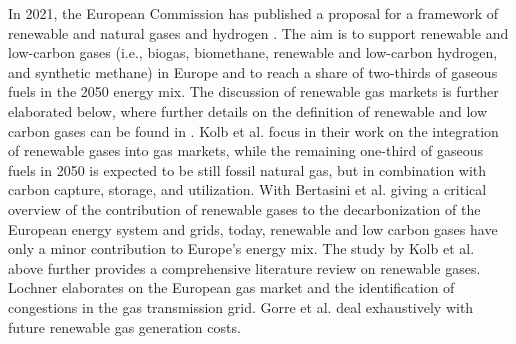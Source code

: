 In 2021, the European Commission has published a proposal for a framework of renewable and natural gases and hydrogen \cite{regulation_renewable_gases}. The aim is to support renewable and low-carbon gases (i.e., biogas, biomethane, renewable and low-carbon hydrogen, and synthetic methane) in Europe and to reach a share of two-thirds of gaseous fuels in the 2050 energy mix. The discussion of renewable gas markets is further elaborated below, where further details on the definition of renewable and low carbon gases can be found in \cite{briefing_renewable_gases}.  Kolb et al. \cite{kolb2021scenarios} focus in their work on the integration of renewable gases into gas markets, while the remaining one-third of gaseous fuels in 2050 is expected to be still fossil natural gas, but in combination with carbon capture, storage, and utilization. With Bertasini et al. \cite{bertasini2023decarbonization} giving a critical overview of the contribution of renewable gases to the decarbonization of the European energy system and grids, today, renewable and low carbon gases have only a minor contribution to Europe's energy mix. The study by Kolb et al. \cite{kolb2021scenarios} above further provides a comprehensive literature review on renewable gases. Lochner \cite{lochner2011identification} elaborates on the European gas market and the identification of congestions in the gas transmission grid. Gorre et al. \cite{gorre2019production} deal exhaustively with future renewable gas generation costs.\vspace{0.3cm}

